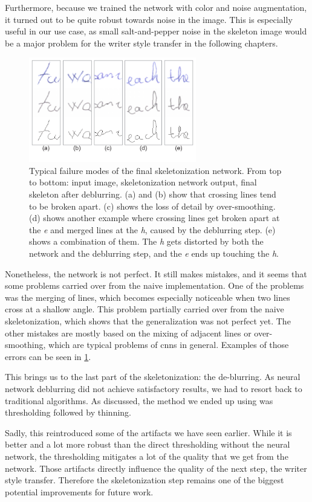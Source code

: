 Furthermore, because we trained the network with color and noise augmentation, it turned out to be quite robust towards noise in the image. This is especially useful in our use case, as small salt-and-pepper noise in the skeleton image would be a major problem for the writer style transfer in the following chapters.


\begin{figure}[H]
  \centering
  
  \includegraphics[width=0.65\textwidth]{../assets/skeletonization/compare_fail/fail_table.pdf}
  
  \caption[Typical failure modes of the final skeletonization network]{Typical failure modes of the final skeletonization network. From top to bottom: input image, skeletonization network output, final skeleton after deblurring. (a) and (b) show that crossing lines tend to be broken apart. (c) shows the loss of detail by over-smoothing. (d) shows another example where crossing lines get broken apart at the \emph{e} and merged lines at the \emph{h}, caused by the deblurring step. (e) shows a combination of them. The \emph{h} gets distorted by both the network and the deblurring step, and the \emph{e} ends up touching the \emph{h}.}
  \label{fig:skeletonizationTableOfFailures}
\end{figure}


Nonetheless, the network is not perfect. It still makes mistakes, and it seems that some problems carried over from the naive implementation. One of the problems was the merging of lines, which becomes especially noticeable when two lines cross at a shallow angle. This problem partially carried over from the naive skeletonization, which shows that the generalization was not perfect yet. The other mistakes are mostly based on the mixing of adjacent lines or over-smoothing, which are typical problems of \glspl{cnn} in general. Examples of those errors can be seen in \cref{fig:skeletonizationTableOfFailures}.

This brings us to the last part of the skeletonization: the de-blurring. As neural network deblurring did not achieve satisfactory results, we had to resort back to traditional algorithms. As discussed, the method we ended up using was thresholding followed by thinning.

Sadly, this reintroduced some of the artifacts we have seen earlier. While it is better and a lot more robust than the direct thresholding without the neural network, the thresholding mitigates a lot of the quality that we get from the network. Those artifacts directly influence the quality of the next step, the writer style transfer. Therefore the skeletonization step remains one of the biggest potential improvements for future work.

